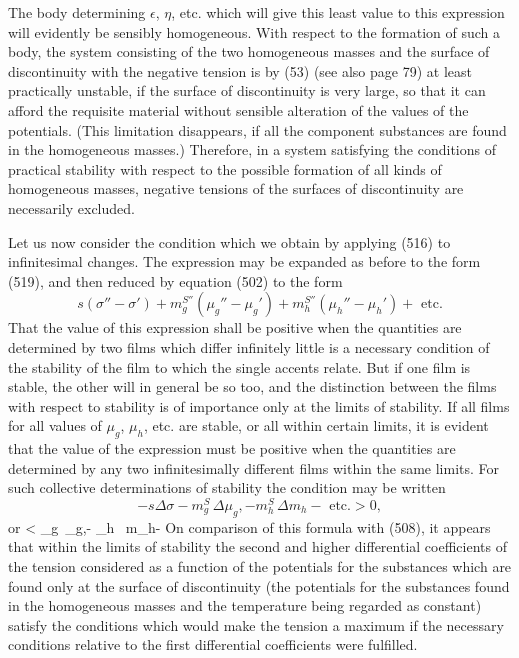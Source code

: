 \documentclass[12pt]{memoir}
\begin{document}
{The body determining $\epsilon$, $\eta$, etc. which will give this least value to this expression will evidently be sensibly homogeneous. With respect to the formation of such a body, the system consisting of the two homogeneous masses and the surface of discontinuity with the negative tension is by (53) (see also page 79) at least practically unstable, if the surface of discontinuity is very large, so that it can afford the requisite material without sensible alteration of the values of the potentials. (This limitation disappears, if all the component substances are found in the homogeneous masses.) Therefore, in a system satisfying the conditions of practical stability with respect to the possible formation of all kinds of homogeneous masses, negative tensions of the surfaces of discontinuity are necessarily excluded.

Let us now consider the condition which we obtain by applying (516) to infinitesimal changes. The expression may be expanded as before to the form (519), and then reduced by equation (502) to the form
$$ s(\sigma'' -\sigma') + m_g^{S''}(\mu_g''-\mu_g') + m_h^{S''}(\mu_h'' -\mu_h')+ \text{ etc.} $$
That the value of this expression shall be positive when the quantities are determined by two films which differ infinitely little is a necessary condition of the stability of the film to which the single accents relate. But if one film is stable, the other will in general be so too, and the distinction between the films with respect to stability is of importance only at the limits of stability. If all films for all values of $\mu_g$, $\mu_h$, etc. are stable, or all within certain limits, it is evident that the value of the expression must be positive when the quantities are determined by any two infinitesimally different films within the same limits. For such collective determinations of stability the condition may be written
$$ -s\Delta \sigma- m_g^S\, \Delta\mu_g,- m_h^S \, \Delta m_h - \text{ etc.} > 0,$$
or
\eqs \Delta \sigma< \Gamma_g\, \Delta\mu_g,- \Gamma_h \, \Delta m_h-  \label{521} \eqe
On comparison of this formula with (508), it appears that within the limits of stability the second and higher differential coefficients of the tension considered as a function of the potentials for the substances which are found only at the surface of discontinuity (the potentials for the substances found in the homogeneous masses and the temperature being regarded as constant) satisfy the conditions which would make the tension a maximum if the necessary conditions relative to the first differential coefficients were fulfilled.

}
\end{document}
